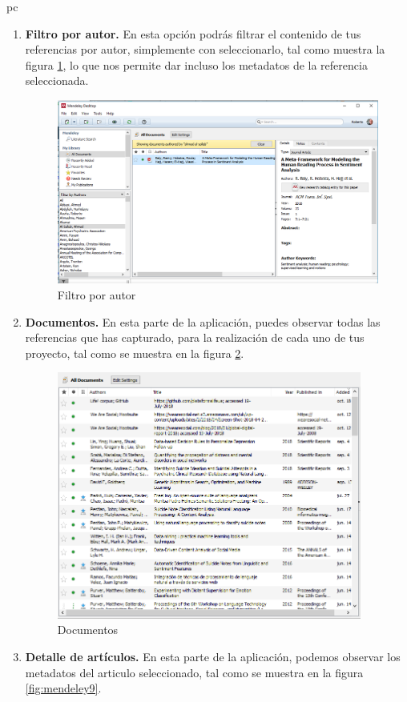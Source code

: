 pc\documentclass[a4paper,12pt,openany]{book}
\begin{document}
\begin{itemize}
\begin{itemize}
\begin{enumerate}
\item \textbf{Filtro por autor.} En esta opción podrás filtrar el contenido de tus referencias por autor, simplemente con seleccionarlo, tal como muestra la figura \ref{fig:mendeley7}, lo que nos permite dar incluso los metadatos de la referencia seleccionada.

\begin{figure}[H]
  \centering
	\includegraphics[width=12cm]{mendeley7.png}
\caption{Filtro por autor}
  \label{fig:mendeley7}
\end{figure}

\item \textbf{Documentos.} En esta parte de la aplicación, puedes observar todas las referencias que has capturado, para la realización de cada uno de tus proyecto, tal como se muestra en la figura \ref{fig:mendeley8}.

\begin{figure}[H]
  \centering
	\includegraphics[width=10cm]{mendeley8.png}
\caption{Documentos}
  \label{fig:mendeley8}
\end{figure}

\item \textbf{Detalle de artículos.} En esta parte de la aplicación, podemos observar los metadatos del articulo seleccionado, tal como se muestra en la figura \ref{fig:mendeley9}.


\end{enumerate}
\end{itemize}
\end{itemize}
\end{document}
